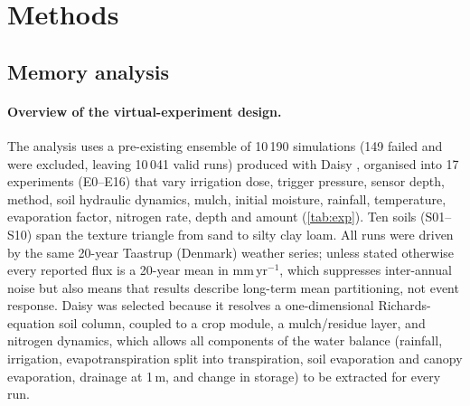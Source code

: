 \section{Methods}
\subsection{Memory analysis}
\label{sec:methods}
\paragraph{Overview of the virtual-experiment design.}
The analysis uses a pre-existing ensemble of 10\,190 simulations (149 failed and were excluded, leaving 10\,041 valid runs) produced with Daisy \citep{Hansen2012,Holbak2026}, organised into 17 experiments (E0--E16) that vary irrigation dose, trigger pressure, sensor depth, method, soil hydraulic dynamics, mulch, initial moisture, rainfall, temperature, evaporation factor, nitrogen rate, depth and amount (\cref{tab:exp}). Ten soils (S01--S10) span the texture triangle from sand to silty clay loam. All runs were driven by the same 20-year Taastrup (Denmark) weather series; unless stated otherwise every reported flux is a 20-year mean in mm\,yr$^{-1}$, which suppresses inter-annual noise but also means that results describe long-term mean partitioning, not event response. Daisy was selected because it resolves a one-dimensional Richards-equation soil column, coupled to a crop module, a mulch/residue layer, and nitrogen dynamics, which allows all components of the water balance (rainfall, irrigation, evapotranspiration split into transpiration, soil evaporation and canopy evaporation, drainage at 1\,m, and change in storage) to be extracted for every run.

